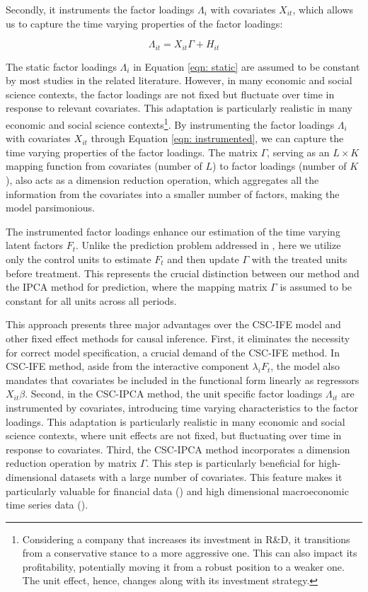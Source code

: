\documentclass[12pt]{article}
\begin{document}
\noindent Secondly, it instruments the factor loadings $\Lambda_i$ with covariates $X_{it}$, which allows us to capture the time varying properties of the factor loadings:

\begin{equation}
\label{eqn: instrumented}
    \Lambda_{it} = X_{it}\Gamma + H_{it}
\end{equation}

The static factor loadings $\Lambda_i$ in Equation \ref{eqn: static} are assumed to be constant by most studies in the related literature. However, in many economic and social science contexts, the factor loadings are not fixed but fluctuate over time in response to relevant covariates. This adaptation is particularly realistic in many economic and social science contexts\footnote{Considering a company that increases its investment in R\&D, it transitions from a conservative stance to a more aggressive one. This can also impact its profitability, potentially moving it from a robust position to a weaker one. The unit effect, hence, changes along with its investment strategy.}. By instrumenting the factor loadings $\Lambda_i$ with covariates $X_{it}$ through Equation \ref{eqn: instrumented}, we can capture the time varying properties of the factor loadings. The matrix $\Gamma$, serving as an $L \times K$ mapping function from covariates (number of $L$) to factor loadings (number of $K$), also acts as a dimension reduction operation, which aggregates all the information from the covariates into a smaller number of factors, making the model parsimonious.

The instrumented factor loadings enhance our estimation of the time varying latent factors $F_t$. Unlike the prediction problem addressed in \cite{kelly2020instrumented,kelly2019characteristics}, here we utilize only the control units to estimate $F_t$ and then update $\Gamma$ with the treated units before treatment. This represents the crucial distinction between our method and the IPCA method for prediction, where the mapping matrix $\Gamma$ is assumed to be constant for all units across all periods. 

This approach presents three major advantages over the CSC-IFE model and other fixed effect methods for causal inference. First, it eliminates the necessity for correct model specification, a crucial demand of the CSC-IFE method. In CSC-IFE method, aside from the interactive component $\lambda_i F_t$, the model also mandates that covariates be included in the functional form linearly as regressors $X_{it}\beta$. Second, in the CSC-IPCA method, the unit specific factor loadings $\Lambda_{it}$ are instrumented by covariates, introducing time varying characteristics to the factor loadings. This adaptation is particularly realistic in many economic and social science contexts, where unit effects are not fixed, but fluctuating over time in response to covariates. Third, the CSC-IPCA method incorporates a dimension reduction operation by matrix $\Gamma$. This step is particularly beneficial for high-dimensional datasets with a large number of covariates. This feature makes it particularly valuable for financial data (\cite{feng2020taming}) and high dimensional macroeconomic time series data (\cite{brave2009chicago}).
\end{document}
